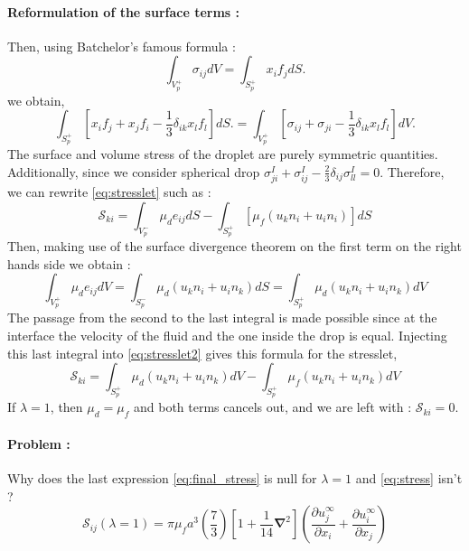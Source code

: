 \documentclass[12pt]{My_preprint}
\newcommand{\grad}{\mathbf{\nabla}}
\renewcommand{\ref}[1]{\autoref{#1}}
\begin{document}
\paragraph*{Reformulation of the surface terms :}
Then, using Batchelor’s famous formula :
\begin{equation*}
    \int_{V^+_p} \sigma_{ij} dV 
    = \int_{S^+_p} x_i f_j dS.
    \label{eq:bachelor}
\end{equation*}
 we obtain, 
\begin{equation}
    \int_{S^+_p} \left[
        x_i f_j+ x_j f_i - \frac{1}{3}\delta_{ik}x_lf_l
    \right]  dS.
    = \int_{V^+_p} \left[
        \sigma_{ij} 
        + \sigma_{ji} 
        - \frac{1}{3}\delta_{ik}x_lf_l
        \right]
    dV.
\end{equation}
The surface and volume stress of the droplet are purely symmetric quantities.
Additionally, since we consider spherical drop $\sigma^I_{ji} + \sigma^I_{ij} -\frac{2}{3}\delta_{ij}\sigma_{ll}^I = 0$.
Therefore, we can rewrite \ref{eq:stresslet} such as :
\begin{equation}
    \label{eq:stresslet2}
    \mathscr{S}_{ki}
    = 
    \int_{V_p^-}
        \mu_d e_{ij} 
    dS
    - \int_{S_p^+}
    \left[
         \mu_f (u_k n_i+u_i n_i)
    \right]
    dS
\end{equation}
Then, making use of the surface divergence theorem on the first term on the right hands side we obtain :
\begin{equation*}
    \int_{V_p^+}
        \mu_d e_{ij}
    dV
    = \int_{S_p^-}
        \mu_d (u_k n_i+u_i n_k)
    dS
    = 
    \int_{S_p^+}
        \mu_d (u_k n_i+u_i n_k)
    dV
\end{equation*}
The passage from the second to the last integral is made possible since at the interface the velocity of the fluid and the one inside the drop is equal. 
Injecting this last integral into \ref{eq:stresslet2} gives this formula for the stresslet, 
\begin{equation}
    \mathscr{S}_{ki}
    = 
    \int_{S_p^+}
        \mu_d (u_k n_i+u_i n_k)
    dV
    - \int_{S_p^+}
    \mu_f (u_k n_i+u_i n_k)
    dV
    \label{eq:final_stress}
\end{equation}
If $\lambda =1$, then $\mu_d=\mu_f$ and both terms cancels out, and we are left with :  $\mathscr{S}_{ki} = 0$. 

\paragraph*{Problem :}
Why does the last expression \ref{eq:final_stress} is null for $\lambda=1$ and \ref{eq:stress} isn't ?
\begin{equation}
    \label{eq:stress}
    \mathscr{S}_{ij}(\lambda=1)
    =\pi \mu_f a^3 \left(
        \frac{7}{3}
    \right)
    \left[
        1+\frac{1}{14}\grad^2
    \right]
    \left(
        \frac{\partial u^\infty_j}{\partial x_i}
        + \frac{\partial u^\infty_i}{\partial x_j}
    \right)
\end{equation}

\end{document}

